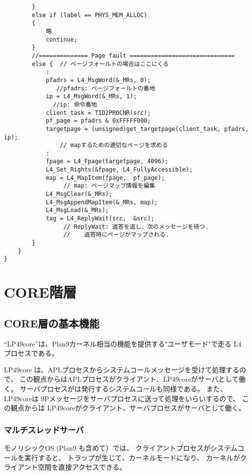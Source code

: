 {\begin{verbatim}
        }
        else if (label == PHYS_MEM_ALLOC)
        {
            略
            continue;
        }
        //============== Page fault ==============================
        else {  // ページフォールトの場合はここにくる
            :
            pfadrs = L4_MsgWord(&_MRs, 0);  
               //pfadrs: ページフォールトの番地
            ip = L4_MsgWord(&_MRs, 1);      
              //ip: 命令番地
            client_task = TID2PROCNR(src);
            pf_page = pfadrs & 0xFFFFF000;
            targetpage = (unsigned)get_targetpage(client_task, pfadrs, ip);
                // mapするための適切なページを求める
            :
            fpage = L4_Fpage(targetpage, 4096);
            L4_Set_Rights(&fpage, L4_FullyAccessible);
            map = L4_MapItem(fpage,  pf_page);  
                 // map: ページマップ情報を編集 
            L4_MsgClear(&_MRs);
            L4_MsgAppendMapItem(&_MRs, map);
            L4_MsgLoad(&_MRs);
            tag = L4_ReplyWait(src,  &src); 
                 // ReplyWait: 返答を返し、次のメッセージを待つ.
                 //    返答時にページがマップされる.
        }
    }
}
\end{verbatim}
}




\part{CORE階層}

\chapter{CORE層の基本機能}

    ``LP49core''は、Plan9カーネル相当の機能を提供する"ユーザモード"で走る 
L4 プロセスである。

LP49core は、APLプロセスからシステムコールメッセージを受けて処理するので、
この観点からはAPLプロセスがクライアント、LP49coreがサーバとして働く。
サーバプロセスがは発行するシステムコールも同様である。
また、LP49coreは 9Pメッセージをサーバプロセスに送って処理をいらいするので、
この観点からは LP49coreがクライアント、サーバプロセスがサーバとして働く。


\section{マルチスレッドサーバ}

モノリシックOS (Plan9 も含めて）では、
クライアントプロセスがシステムコールを実行すると、
トラップが生じて、カーネルモードになり、
カーネルがクライアント空間を直接アクセスできる。

